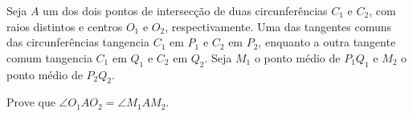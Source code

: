 Seja $A$ um dos dois pontos de intersecção de duas circunferências $C_1$ e $C_2$, com raios distintos e centros $O_1$ e $O_2$, respectivamente. Uma das tangentes comuns das circunferências tangencia $C_1$ em $P_1$ e $C_2$ em $P_2$, enquanto a outra tangente comum tangencia $C_1$ em $Q_1$ e $C_2$ em $Q_2$. Seja $M_1$ o ponto médio de $P_1Q_1$ e $M_2$ o ponto médio de $P_2Q_2$.

Prove que $\angle O_1AO_2=\angle M_1AM_2$.
